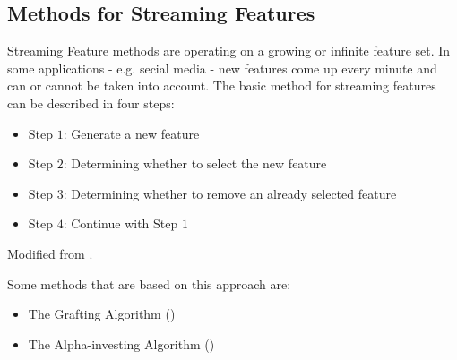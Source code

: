 \subsection{Methods for Streaming Features}
\label{sec:methods.streaming}


Streaming Feature methods are operating on a growing or infinite feature set. In
some applications - e.g. secial media - new features come up every minute and
can or cannot be taken into account. 
The basic method for streaming features can be described in four steps:

\begin{itemize}
  \item Step $1$: Generate a new feature
  \item Step $2$: Determining whether to select the new feature
  \item Step $3$: Determining whether to remove an already selected feature
  \item Step $4$: Continue with Step $1$
\end{itemize} 
Modified from \cite{Tang:14}.
 
Some methods that are based on this approach are:
\begin{itemize}
  \item The Grafting Algorithm (\cite{perkins2003online})
  \item The Alpha-investing Algorithm (\cite{zhou2005learning})
\end{itemize}



